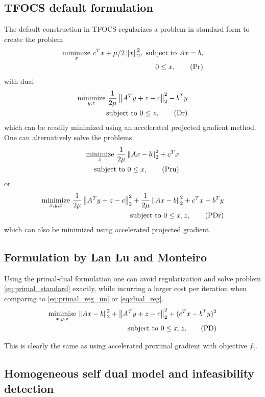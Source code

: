 \documentclass[smallextended]{article}       %
\begin{document}
\subsection{TFOCS default formulation}
The default construction in TFOCS regularizes a problem in 
standard form to create the problem
\begin{align*}
  \underset{x}{\operatorname{minimize}}\ {c^Tx + \mu/2\left\| x \right\|^2_2},
  \text{ subject to } Ax=b,\\
      0\leq x,
  \label{eq:primal_reg}
  \tag{Pr}
\end{align*}
with dual
\begin{align*}
  \underset{y,z}{\operatorname{minimize}}\ {\frac{1}{2\mu}\left\| A^Ty+z-c \right\|_2^2-b^Ty} \\
  \text{ subject to } 0\leq z,
  \label{eq:dual_reg}
  \tag{Dr}
\end{align*}
which can be readily minimized using an accelerated projected gradient method.
One can alternatively solve the problems
\begin{align*}
  \underset{x}{\operatorname{minimize}}\ {\frac{1}{2\mu}\left\| Ax-b \right\|_2^2} + c^Tx\\
  \text{ subject to } 0\leq x,
  \label{eq:primal_reg_un}
  \tag{Pru}
\end{align*}
or 
\begin{align*}
  \underset{x,y,z}{\operatorname{minimize}}\ {\frac{1}{2\mu}\left\| A^Ty+z-c \right\|_2^2 + \frac{1}{2\mu}\left\| Ax-b \right\|_2^2 + c^Tx-b^Ty}\\
  \text{ subject to } 0\leq x,z,
  \label{eq:primal_dual_reg}
  \tag{PDr}
\end{align*}
which can also be minimized using accelerated projected gradient.

\subsection{Formulation by Lan Lu and Monteiro}
Using the primal-dual formulation one can avoid regularization and solve problem \eqref{eq:primal_standard} exactly,
while incurring a larger cost per iteration when comparing to \eqref{eq:primal_reg_un} or \eqref{eq:dual_reg}.
\begin{align}
  \underset{x,y,z}{\operatorname{minimize}}\ {\left\| Ax-b \right\|_2^2+\left\| A^Ty+z-c \right\|_2^2+(c^Tx-b^Ty)^2}\\
  \text{ subject to } 0\leq x,z.
  \label{eq:primal_dual}
  \tag{PD}
\end{align}

This is clearly the same as using accelerated proximal gradient with objective $f_1$.

\subsection{Homogeneous self dual model and infeasibility detection}
\end{document}
